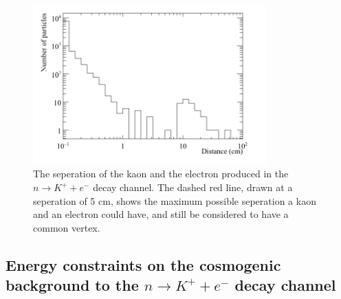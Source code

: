 \begin{figure}[h!]
  \centering
  \includegraphics[width=0.8\textwidth]{NucleonDecay_KaonElecSep}
  \caption[The seperation of the kaon and the electron produced in the $n \rightarrow K^{+} + e^{-}$ decay channel]
          {The seperation of the kaon and the electron produced in the $n \rightarrow K^{+} + e^{-}$ decay channel. The dashed red line, drawn at a seperation of 5 cm, shows the maximum possible seperation a kaon and an electron could have, and still be considered to have a common vertex.}
  \label{fig:NDK_Sig_KEDist}
\end{figure}

\subsection{Energy constraints on the cosmogenic background to the $n \rightarrow K^{+} + e^{-}$ decay channel} \label{sec:NDKEnCosmBk}

